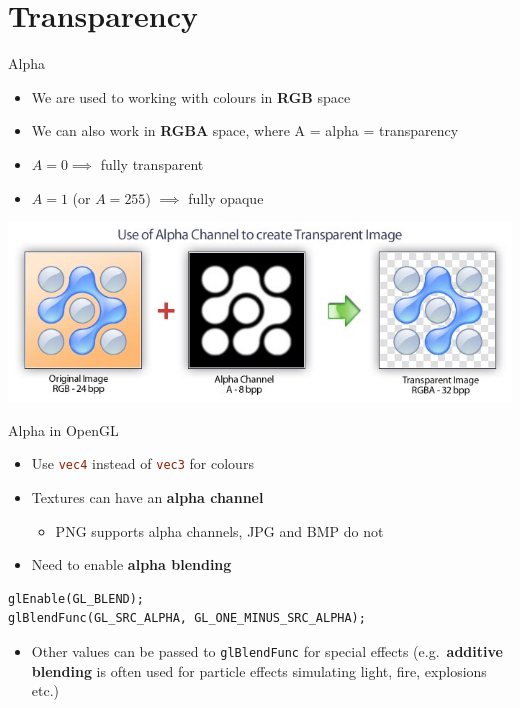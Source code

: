 \part{Transparency}
\frame{\partpage}

\begin{frame}{Alpha}
	\begin{itemize}
		\item We are used to working with colours in \textbf{RGB} space
		\pause\item We can also work in \textbf{RGBA} space, where A = alpha = transparency
		\pause\item $A=0 \implies$ fully transparent
		\pause\item $A=1$ (or $A=255$) $\implies$ fully opaque
	\end{itemize}
	\pause
	\begin{center}
		\includegraphics[width=\textwidth]{alpha_channel}
	\end{center}
\end{frame}

\begin{frame}[fragile]{Alpha in OpenGL}
	\begin{itemize}
		\item Use \lstinline[language=GLSL]{vec4} instead of \lstinline[language=GLSL]{vec3} for colours
		\pause\item Textures can have an \textbf{alpha channel}
			\begin{itemize}
				\pause\item PNG supports alpha channels, JPG and BMP do not
			\end{itemize}
		\pause\item Need to enable \textbf{alpha blending}
	\end{itemize}
	\pause
	\begin{lstlisting}
glEnable(GL_BLEND);
glBlendFunc(GL_SRC_ALPHA, GL_ONE_MINUS_SRC_ALPHA);
	\end{lstlisting}
	\begin{itemize}	
		\item Other values can be passed to \lstinline{glBlendFunc} for special effects
			(e.g.\ \textbf{additive blending} is often used for particle effects simulating
				light, fire, explosions etc.)
	\end{itemize}
\end{frame}

